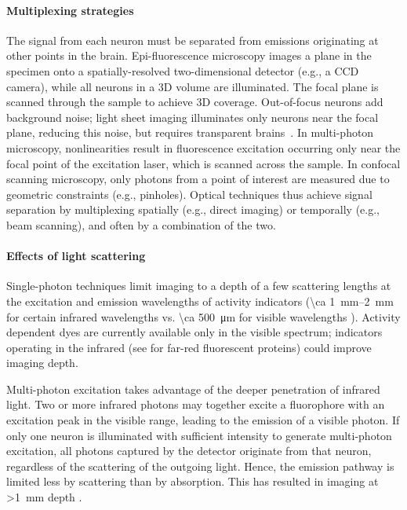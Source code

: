 \paragraph{Multiplexing strategies}
The signal from each neuron must be separated from emissions originating at other points in the brain.
Epi-fluorescence microscopy images a plane in the specimen onto a spatially-resolved two-dimensional detector (e.g., a CCD camera), while all neurons in a 3D volume are illuminated. The focal plane is scanned through the sample to achieve 3D coverage. Out-of-focus neurons add background noise; light sheet imaging illuminates only neurons near the focal plane, reducing this noise, but requires transparent brains~\cite{ahrens13}.
In multi-photon microscopy, nonlinearities result in fluorescence excitation occurring only near the focal point of the excitation laser, which is scanned across the sample.
In confocal scanning microscopy, only photons from a point of interest are measured due to geometric constraints (e.g., pinholes).
Optical techniques thus achieve signal separation by multiplexing spatially (e.g., direct imaging) or temporally (e.g., beam scanning), and often by a combination of the two.

\paragraph{Effects of light scattering}
Single-photon techniques limit imaging to a depth of a few scattering lengths at the excitation and emission wavelengths of activity indicators (\SIrange{\ca 1}{2}{\milli\meter} for certain infrared wavelengths \cite{horton13,kobat09,Kobat2011} vs. \SI{ \ca 500}{\micro\meter} for visible wavelengths \cite{Wilt2009}).
Activity dependent dyes are currently available only in the visible spectrum; indicators operating in the infrared (see \cite{filonov11,shcherbakova13, Shcherbo2009} for far-red fluorescent proteins) could improve imaging depth.

Multi-photon excitation takes advantage of the deeper penetration of infrared light.
Two or more infrared photons may together excite a fluorophore with an excitation peak in the visible range, leading to the emission of a visible photon.
If only one neuron is illuminated with sufficient intensity to generate multi-photon excitation, all photons captured by the detector originate from that neuron, regardless of the scattering of the outgoing light. Hence, the emission pathway is limited less by scattering than by absorption.
This has resulted in imaging at \SI{>1}{\milli\meter} depth \cite{horton13,kobat09, Kobat2011}.

